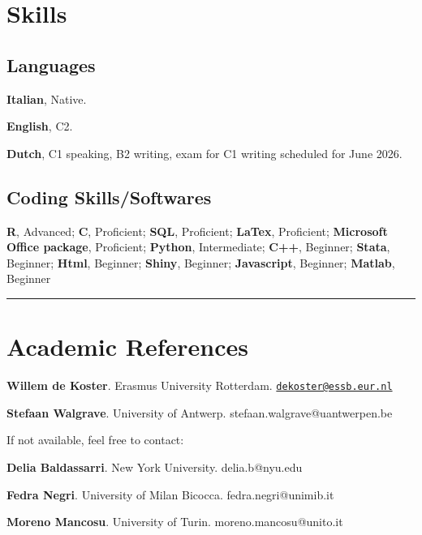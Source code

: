 \documentclass[10pt,]{article}
\providecommand{\tightlist}{%
  \setlength{\itemsep}{0pt}\setlength{\parskip}{0pt}}
\renewenvironment{itemize}{
  \begin{list}{}{
    \setlength{\leftmargin}{1.5em}
  }
}{
  \end{list}
}
\begin{document}
\section{Skills}\label{skills}

\subsection{Languages}\label{languages}

\begin{itemize}
\tightlist
\item
  \textbf{Italian}, Native.
\item
  \textbf{English}, C2.
\item
  \textbf{Dutch}, C1 speaking, B2 writing, exam for C1 writing scheduled
  for June 2026.
\end{itemize}

\subsection{Coding Skills/Softwares}\label{coding-skillssoftwares}

\begin{itemize}
\item
  \textbf{R}, Advanced; \textbf{C}, Proficient; \textbf{SQL},
  Proficient; \textbf{LaTex}, Proficient; \textbf{Microsoft Office
  package}, Proficient; \textbf{Python}, Intermediate; \textbf{C++},
  Beginner; \textbf{Stata}, Beginner; \textbf{Html}, Beginner;
  \textbf{Shiny}, Beginner; \textbf{Javascript}, Beginner;
  \textbf{Matlab}, Beginner

  \bigskip \hrule
\end{itemize}

\section{Academic References}\label{academic-references}

\begin{itemize}
\item
  \textbf{Willem de Koster}. Erasmus University Rotterdam.
  \href{mailto:dekoster@essb.eur.nl}{\nolinkurl{dekoster@essb.eur.nl}}
\item
  \textbf{Stefaan Walgrave}. University of Antwerp.
  stefaan.walgrave@uantwerpen.be
\end{itemize}

If not available, feel free to contact:

\begin{itemize}
\item
  \textbf{Delia Baldassarri}. New York University. delia.b@nyu.edu
\item
  \textbf{Fedra Negri}. University of Milan Bicocca.
  fedra.negri@unimib.it
\item
  \textbf{Moreno Mancosu}. University of Turin. moreno.mancosu@unito.it
\end{itemize}
\end{document}
